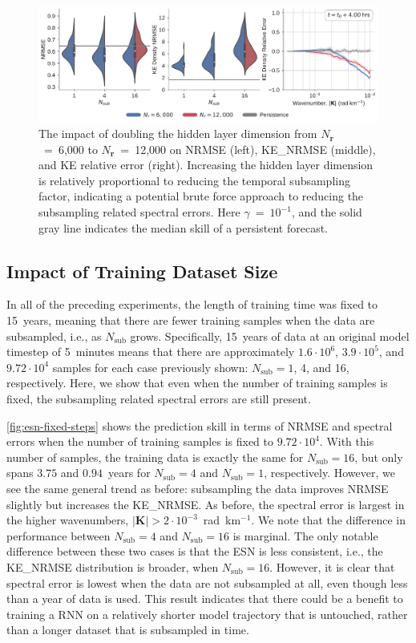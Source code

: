 \documentclass[draft]{agujournal2019}
\newcommand{\hidden}{\mathbf{r}}
\newcommand{\nhidden}{N_{\hidden}}
\newcommand{\nsub}{N_\text{sub}}
\begin{document}
\begin{figure}
    \centering
    \includegraphics[width=\textwidth]{rc_reservoir_size.pdf}
    \caption{The impact of doubling the hidden layer dimension from
        $\nhidden$~=~6,000 to
        $\nhidden$~=~12,000 on NRMSE (left), KE\_NRMSE (middle), and KE relative
        error (right).
        Increasing the hidden layer dimension is relatively proportional to reducing
        the temporal subsampling factor, indicating a potential brute force
        approach to reducing the subsampling related spectral errors.
        Here $\gamma$~=~$10^{-1}$, and the solid gray line indicates the
        median skill of a persistent forecast.
    }
    \label{fig:esn-size}
\end{figure}

\subsection{Impact of Training Dataset Size}
\label{subsec:esn-fixed-steps}

In all of the preceding experiments, the length of training time was fixed to
15~years, meaning that there are fewer training samples when the data are
subsampled, i.e., as $\nsub$ grows.
Specifically, 15~years of data at an original model timestep of 5~minutes means
that there are approximately
$1.6\cdot10^{6}$, $3.9\cdot10^5$, and $9.72\cdot10^4$ samples
for each case previously shown: $\nsub=1$, 4, and 16, respectively.
Here, we show that even when the number of training samples is fixed, the
subsampling related spectral errors are still present.

\cref{fig:esn-fixed-steps} shows the prediction skill in terms of NRMSE and
spectral errors when the number of training samples is fixed to $9.72\cdot10^4$.
With this number of samples, the training data is exactly the same for
$\nsub=16$, but only spans $3.75$ and $0.94$~years for $\nsub=4$ and $\nsub=1$,
respectively.
However, we see the same general trend as before: subsampling the data improves
NRMSE slightly but increases the KE\_NRMSE.
As before, the spectral error is largest in the higher wavenumbers,
$|\mathbf{K}| > 2\cdot10^{-3}$~rad~km$^{-1}$.
We note that the difference in performance between $\nsub=4$ and $\nsub=16$ is
marginal.
The only notable difference between these two cases is that the ESN is less
consistent, i.e., the KE\_NRMSE distribution is broader, when $\nsub=16$.
However, it is clear that spectral error is lowest when the data are not
subsampled at all, even though less than a year of data is used.
This result indicates that there could be a benefit to training a RNN on a
relatively shorter model trajectory that is untouched, rather than a longer
dataset that is subsampled in time.
\end{document}
